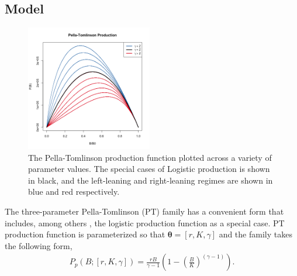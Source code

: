 \subsection{Model}

%
\begin{figure} %
\vspace{-1cm}
\includegraphics[width=0.49\textwidth]{../ptNew/g4PT.png}
\vspace{-1cm}
\caption{
The Pella-Tomlinson production function plotted across a variety of parameter
values. The special cases of Logistic production is shown in black, and the
left-leaning and right-leaning regimes are shown in blue and red respectively.
}
\label{SrrPT}
\end{figure}

%
\renewcommand{\baselinestretch}{2.5}
The three-parameter Pella-Tomlinson (PT) family has a convenient form that includes, among
others \cite{fox_jr_exponential_1970,rankin_alternative_2015}, the
logistic production function as a special case. %
PT production function is parameterized so that $\bm{\theta} = [r, K, \gamma]$
and the family takes the following form,
\begingroup
\footnotesize
\begin{align}
P_{p}(B; [r, K, \gamma]) = \frac{r B}{\gamma-1} \left(1-\left(\frac{B}{K}\right)^{(\gamma-1)}\right). \label{pt}
\end{align}
\endgroup

